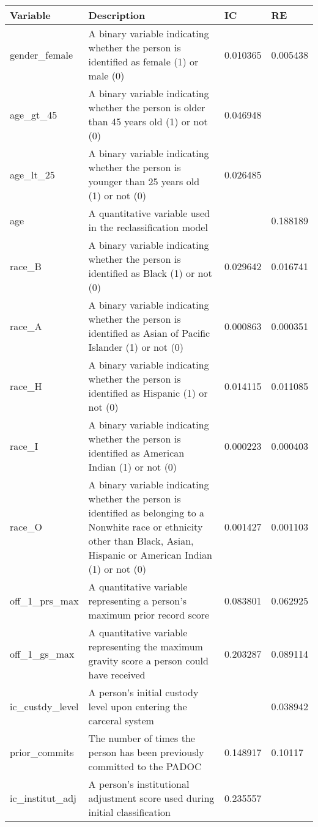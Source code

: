 \documentclass{amsproc}
\numberwithin{equation}{section}
\theoremstyle{plain}
\theoremstyle{remark}
\begin{document}
\begin{table}\tiny
\begin{tabular}{|p{.7in}||p{2.6in}|p{.45in}|p{.45in}|}\hline
Variable & Description & IC & RE\\\hline
gender\_female & A binary variable indicating whether the person is identified as female (1) or male (0)&	0.010365&	0.005438\\\hline
age\_gt\_45& A binary variable indicating whether the person is older than 45 years old (1) or not  (0)	& 0.046948	& \\\hline
age\_lt\_25& A binary variable indicating whether the person is younger than 25 years old (1) or not  (0)	&	0.026485 & \\	\hline
age	& A quantitative variable used in the reclassification model & & 	0.188189\\\hline
race\_B	&  A binary variable indicating whether the person is identified as Black (1) or not (0)& 0.029642&	0.016741\\\hline
race\_A	&  A binary variable indicating whether the person is identified as Asian of Pacific Islander (1) or not (0)& 0.000863&	0.000351\\\hline
race\_H	&  A binary variable indicating whether the person is identified as Hispanic (1) or not (0)& 0.014115&	0.011085\\\hline
race\_I	&  A binary variable indicating whether the person is identified as American Indian (1) or not (0)& 0.000223&	0.000403\\\hline
race\_O	&  A binary variable indicating whether the person is identified as belonging to a Nonwhite race or ethnicity other than Black, Asian, Hispanic or American Indian (1) or not (0)& 0.001427&	0.001103\\\hline
off\_1\_prs\_max& A quantitative variable representing a person's maximum prior record score &	0.083801	&0.062925\\\hline
off\_1\_gs\_max& A quantitative variable representing the maximum gravity score a person could have received &	0.203287&	0.089114\\\hline
ic\_custdy\_level & A person's initial custody level upon entering the carceral system & &		0.038942\\\hline
prior\_commits & The number of times the person has been previously committed to the PADOC &	0.148917&	0.10117\\\hline
ic\_institut\_adj & A person's institutional adjustment score used during initial classification &	0.235557&\\	\hline

\end{tabular}
\end{table}
\end{document}
